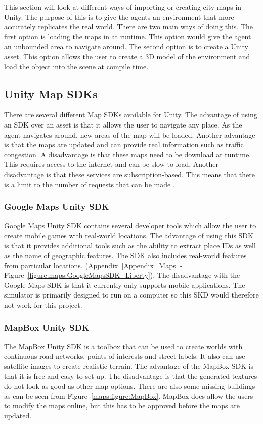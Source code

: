 This section will look at different ways of importing or creating city maps in Unity. The purpose of this is to give the agents an environment that more accurately replicates the real world. There are two main ways of doing this. The first option is loading the maps in at runtime. This option would give the agent an unbounded area to navigate around. The second option is to create a Unity asset. This option allows the user to create a 3D model of the environment and load the object into the scene at compile time.  
\subsection{Unity Map SDKs}
There are several different Map SDKs available for Unity. The advantage of using an SDK over an asset is that it allows the user to navigate any place. As the agent navigates around, new areas of the map will be loaded. Another advantage is that the maps are updated and can provide real information such as traffic congestion. A disadvantage is that these maps need to be download at runtime. This requires access to the internet and can be slow to load. Another disadvantage is that these services are subscription-based. This means that there is a limit to the number of requests that can be made \cite{}.

\subsubsection{Google Maps Unity SDK}

Google Maps Unity SDK contains several developer tools which allow the user to create mobile games with real-world locations\cite{google_maps_sdk_platform}. The advantage of using this SDK is that it provides additional tools such as the ability to extract place IDs as well as the name of geographic features. The SDK also includes real-world features from particular locations. (Appendix~\ref{Appendix_Maps} - Figure~\ref{figure:maps:GoogleMapsSDK_Liberty}). The disadvantage with the Google Maps SDK is that it currently only supports mobile applications. The simulator is primarily designed to run on a computer so this SKD would therefore not work for this project. 

\subsubsection{MapBox Unity SDK} 
The MapBox Unity SDK is a toolbox that can be used to create worlds with continuous road networks, points of interests and street labels. It also can use satellite images to create realistic terrain. The advantage of the MapBox SDK is that it is free and easy to set up. The disadvantage is that the generated textures do not look as good as other map options. There are also some missing buildings as can be seen from Figure~\ref{maps:figure:MapBox}. MapBox does allow the users to modify the maps online, but this has to be approved before the maps are updated.  

